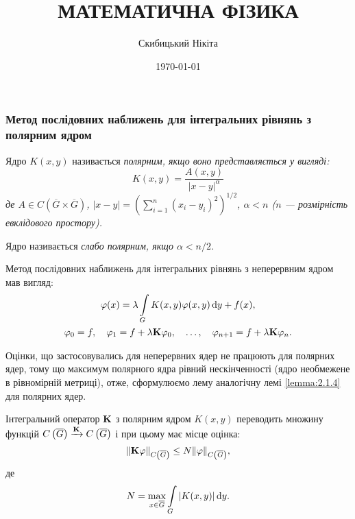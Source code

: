 

\title{{\Huge МАТЕМАТИЧНА ФІЗИКА}}
\author{Скибицький Нікіта}
\date{\today}





\tableofcontents




\subsubsection{Метод послідовних наближень для інтегральних рівнянь з полярним ядром}

\begin{definition}
	Ядро $K(x, y)$ називається \it{полярним}, якщо воно представляється у вигляді:
	\begin{equation}
		K(x, y) = \dfrac{A(x, y)}{|x - y|^\alpha}
	\end{equation}
	де $A \in C\left(\overline G \times \overline G\right)$, $|x - y| = \left( \sum_{i = 1}^n (x_i - y_i)^2 \right)^{1/2}$, $\alpha < n$ ($n$ --- розмірність евклідового простору).
\end{definition}

\begin{definition}
	Ядро називається \it{слабо полярним}, якщо $\alpha < n / 2$.
\end{definition}

Метод послідовних наближень для інтегральних рівнянь з неперервним ядром мав вигляд: 
\begin{multline}
	\phi(x) = \lambda \Int_G K(x, y) \phi(x, y) \diff y + f(x), \\
	\phi_0 = f, \quad \phi_1 = f + \lambda \bf{K} \phi_0, \quad \ldots, \quad \phi_{n + 1} = f + \lambda \bf{K} \phi_n.
\end{multline}

Оцінки, що застосовувались для неперервних ядер не працюють для полярних ядер, тому що максимум полярного ядра рівний нескінченності (ядро необмежене в рівномірній метриці), отже, сформулюємо лему аналогічну лемі \ref{lemma:2.1.4} для полярних ядер. 

\begin{lemma}
	Інтегральний оператор $\bf{K}$ з полярним ядром $K(x, y)$ переводить множину функцій $C\left(\overline G\right) \xrightarrow{\bf{K}} C \left(\overline G\right)$ і при цьому має місце оцінка: 
	\begin{equation}
		\| \bf{K} \phi \|_{C\left(\overline G\right)} \le N \| \phi\|_{C\left(\overline G\right)},
	\end{equation}
	де 
	\begin{equation}
		N = \Max_{x \in \overline G} \Int_G |K(x, y)| \diff y.
	\end{equation}
\end{lemma}

